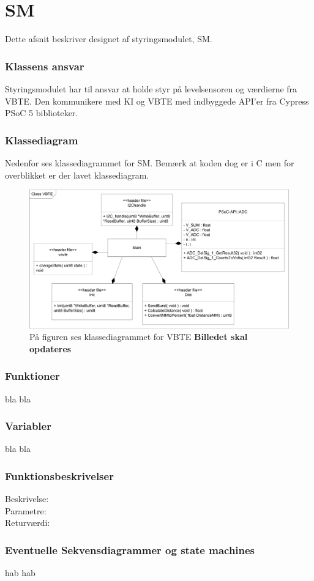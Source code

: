 \chapter{SM}
Dette afsnit beskriver designet af styringsmodulet, SM.
\subsection{Klassens ansvar}
Styringsmodulet har til ansvar at holde styr på levelsensoren og værdierne fra VBTE. Den kommunikere med KI og VBTE med indbyggede API'er fra Cypress PSoC 5 biblioteker. 
\subsection{Klassediagram}
Nedenfor ses klassediagrammet for SM. Bemærk at koden dog er i C men for overblikket er der lavet klassediagram.
\begin{figure}
\centering
\includegraphics[width=1\textwidth]{billeder/ClassVBTE}
\caption{På figuren ses klassediagrammet for VBTE \textbf{Billedet skal opdateres}}
\end{figure}
\subsection{Funktioner}
bla bla
\subsection{Variabler}
bla bla
\subsection{Funktionsbeskrivelser}
Beskrivelse:\\
Parametre:\\
Returværdi:\\
\subsection{Eventuelle Sekvensdiagrammer og state machines}
hab hab